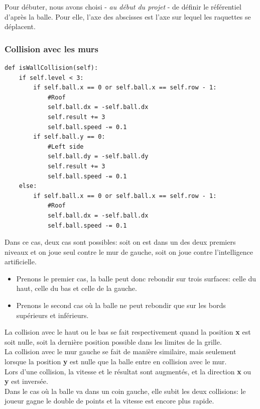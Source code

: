 Pour débuter, nous avons choisi - \textit{au début du projet} - de définir le
référentiel d'après la balle. Pour elle, l'axe des abscisses est l'axe sur lequel
les raquettes se déplacent.

\subsubsection{Collision avec les murs}
\label{sec:collision-murs}

\begin{verbatim}
def isWallCollision(self):
    if self.level < 3:
        if self.ball.x == 0 or self.ball.x == self.row - 1:
            #Roof
            self.ball.dx = -self.ball.dx
            self.result += 3
            self.ball.speed -= 0.1
        if self.ball.y == 0:
            #Left side
            self.ball.dy = -self.ball.dy
            self.result += 3
            self.ball.speed -= 0.1
    else:
        if self.ball.x == 0 or self.ball.x == self.row - 1:
            #Roof
            self.ball.dx = -self.ball.dx
            self.ball.speed -= 0.1
\end{verbatim}

Dans ce cas, deux cas sont possibles: soit on est dans un des deux premiers
niveaux et on joue seul contre le mur de gauche, soit on joue contre
l'intelligence artificielle.

\begin{itemize}

    \item Prenons le premier cas, la balle peut donc rebondir sur trois surfaces: celle du
    haut, celle du bas et celle de la gauche.

    \item Prenons le second cas où la balle ne peut rebondir que sur les bords
    supérieurs et inférieurs.

\end{itemize}

La collision avec le haut ou le bas se fait respectivement quand la position
\textbf{x} est soit nulle, soit la dernière position possible dans les limites
de la grille.\\
La collision avec le mur gauche se fait de manière similaire, mais seulement
lorsque la position \textbf{y} est nulle que la balle entre en collision avec le
mur. \\

Lors d'une collision, la vitesse et le résultat sont augmentés, et la direction
\textbf{x} ou \textbf{y} est inversée. \\
Dans le cas où la balle va dans un coin gauche, elle subit les deux collisions:
le joueur gagne le double de points et la vitesse est encore plus rapide.

